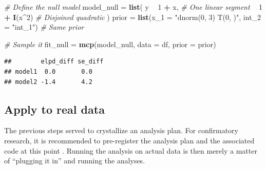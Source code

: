 \documentclass[
  american,
]{article}
\newenvironment{Shaded}{\begin{snugshade}}{\end{snugshade}}
\newcommand{\CommentTok}[1]{\textcolor[rgb]{0.56,0.35,0.01}{\textit{#1}}}
\newcommand{\DataTypeTok}[1]{\textcolor[rgb]{0.13,0.29,0.53}{#1}}
\newcommand{\DecValTok}[1]{\textcolor[rgb]{0.00,0.00,0.81}{#1}}
\newcommand{\KeywordTok}[1]{\textcolor[rgb]{0.13,0.29,0.53}{\textbf{#1}}}
\newcommand{\NormalTok}[1]{#1}
\newcommand{\OperatorTok}[1]{\textcolor[rgb]{0.81,0.36,0.00}{\textbf{#1}}}
\newcommand{\StringTok}[1]{\textcolor[rgb]{0.31,0.60,0.02}{#1}}
\begin{document}
\begin{Shaded}
\begin{Highlighting}[]
\CommentTok{# Define the null model}
\NormalTok{model_null =}\StringTok{ }\KeywordTok{list}\NormalTok{(}
\NormalTok{  y }\OperatorTok{~}\StringTok{ }\DecValTok{1} \OperatorTok{+}\StringTok{ }\NormalTok{x,      }\CommentTok{# One linear segment}
    \OperatorTok{~}\StringTok{ }\DecValTok{1} \OperatorTok{+}\StringTok{ }\KeywordTok{I}\NormalTok{(x}\OperatorTok{^}\DecValTok{2}\NormalTok{)  }\CommentTok{# Disjoined quadratic}
\NormalTok{)}
\NormalTok{prior =}\StringTok{ }\KeywordTok{list}\NormalTok{(}\DataTypeTok{x_1 =} \StringTok{"dnorm(0, 3) T(0, )"}\NormalTok{, }\DataTypeTok{int_2 =} \StringTok{"int_1"}\NormalTok{)  }\CommentTok{# Same prior}

\CommentTok{# Sample it}
\NormalTok{fit_null =}\StringTok{ }\KeywordTok{mcp}\NormalTok{(model_null, }\DataTypeTok{data =}\NormalTok{ df, }\DataTypeTok{prior =}\NormalTok{ prior)}
\end{Highlighting}
\end{Shaded}

\begin{Shaded}
\end{Shaded}

\begin{verbatim}
##        elpd_diff se_diff
## model1  0.0       0.0   
## model2 -1.4       4.2
\end{verbatim}

\hypertarget{apply-to-real-data}{%
\subsection{Apply to real data}\label{apply-to-real-data}}

The previous steps served to crystallize an analysis plan. For confirmatory research, it is recommended to pre-register the analysis plan and the associated code at this point \citep{munafo2017}. Running the analysis on actual data is then merely a matter of ``plugging it in'' and running the analyses.
\end{document}
